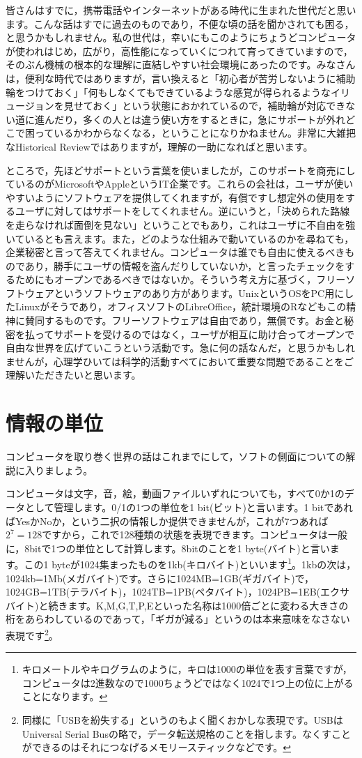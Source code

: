 \documentclass{ltjsbook}
\begin{document}
皆さんはすでに，携帯電話やインターネットがある時代に生まれた世代だと思います。こんな話はすでに過去のものであり，不便な頃の話を聞かされても困る，と思うかもしれません。私の世代は，幸いにもこのようにちょうどコンピュータが使われはじめ，広がり，高性能になっていくにつれて育ってきていますので，そのぶん機械の根本的な理解に直結しやすい社会環境にあったのです。みなさんは，便利な時代ではありますが，言い換えると「初心者が苦労しないように補助輪をつけておく」「何もしなくてもできているような感覚が得られるようなイリュージョンを見せておく」という状態におかれているので，補助輪が対応できない道に進んだり，多くの人とは違う使い方をするときに，急にサポートが外れどこで困っているかわからなくなる，ということになりかねません。非常に大雑把なHistorical Reviewではありますが，理解の一助になればと思います。

ところで，先ほどサポートという言葉を使いましたが，このサポートを商売にしているのがMicrosoftやAppleというIT企業です。これらの会社は，ユーザが使いやすいようにソフトウェアを提供してくれますが，有償ですし想定外の使用をするユーザに対してはサポートをしてくれません。逆にいうと，「決められた路線を走らなければ面倒を見ない」ということでもあり，これはユーザに不自由を強いているとも言えます。また，どのような仕組みで動いているのかを尋ねても，企業秘密と言って答えてくれません。コンピュータは誰でも自由に使えるべきものであり，勝手にユーザの情報を盗んだりしていないか，と言ったチェックをするためにもオープンであるべきではないか。そういう考え方に基づく，フリーソフトウェアというソフトウェアのあり方があります。UnixというOSをPC用にしたLinuxがそうであり，オフィスソフトのLibreOffice，統計環境のRなどもこの精神に賛同するものです。フリーソフトウェアは自由であり，無償です。お金と秘密を払ってサポートを受けるのではなく，ユーザが相互に助け合ってオープンで自由な世界を広げていこうという活動です。急に何の話なんだ，と思うかもしれませんが，心理学ひいては科学的活動すべてにおいて重要な問題であることをご理解いただきたいと思います。

\section{情報の単位}
コンピュータを取り巻く世界の話はこれまでにして，ソフトの側面についての解説に入りましょう。

コンピュータは文字，音，絵，動画ファイルいずれについても，すべて0か1のデータとして管理します。0/1の1つの単位を1 bit(ビット)と言います。1 bitであればYesかNoか，という二択の情報しか提供できませんが，これが7つあれば$2^7=128$ですから，これで128種類の状態を表現できます。コンピュータは一般に，8bitで1つの単位として計算します。8bitのことを1 byte(バイト)と言います。この1 byteが1024集まったものを1kb(キロバイト)といいます\footnote{キロメートルやキログラムのように，キロは1000の単位を表す言葉ですが，コンピュータは2進数なので1000ちょうどではなく1024で1つ上の位に上がることになります。}。1kbの次は，1024kb=1Mb(メガバイト)です。さらに1024MB=1GB(ギガバイト)で，1024GB=1TB(テラバイト)，1024TB=1PB(ペタバイト)，1024PB=1EB(エクサバイト)と続きます。K,M,G,T,P,Eといった名称は1000倍ごとに変わる大きさの桁をあらわしているのであって，「ギガが減る」というのは本来意味をなさない表現です\footnote{同様に「USBを紛失する」というのもよく聞くおかしな表現です。USBはUniversal Serial Busの略で，データ転送規格のことを指します。なくすことができるのはそれにつなげるメモリースティックなどです。}。
\end{document}
